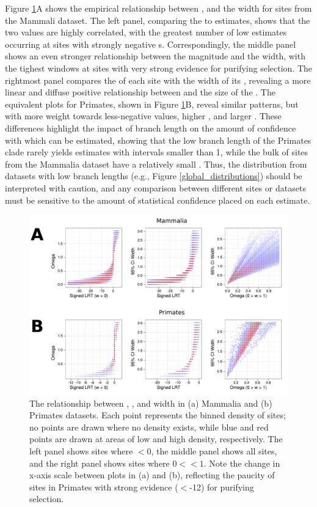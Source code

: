 Figure \ref{sites_scatters}A shows the empirical relationship between
\slrt, \omgml and the \ci width for sites from the Mammali
dataset. The left panel, comparing the \slrt to \nz \omgml estimates,
shows that the two values are highly correlated, with the greatest
number of low \omgml estimates occurring at sites with strongly
negative \slrt{}s. Correspondingly, the middle panel shows an even
stronger relationship between the \slrt magnitude and the \ci width,
with the tighest windows at sites with very strong evidence for
purifying selection. The rightmost panel compares the \omgml of each
site with the width of its \ci, revealing a more linear and diffuse
positive relationship between \omgml and the size of the \ci. The
equivalent plots for Primates, shown in Figure \ref{sites_scatters}B,
reveal similar patterns, but with more weight towards less-negative
\slrt values, higher \omgml, and larger \ci. These differences
highlight the impact of branch length on the amount of confidence with
which \omg can be estimated, showing that the low branch length of the
Primates clade rarely yields \omgml estimates with \ci intervals
smaller than 1, while the bulk of sites from the Mammalia dataset have
a relatively small \ci. Thus, the \omgml distribution from datasets
with low branch lengths (e.g., Figure \ref{global_distributions})
should be interpreted with caution, and any comparison between
different sites or datasets must be sensitive to the amount of
statistical confidence placed on each estimate.

\begin{figure}
\centering
\includegraphics[scale=0.6]{Figs/sites_scatters.pdf}
\caption{The relationship between \slrt, \omgml, and \ci width in (a)
  Mammalia and (b) Primates datasets. Each point represents the binned
  density of sites; no points are drawn where no density exists, while
  blue and red points are drawn at areas of low and high density,
  respectively. The left panel shows sites where \omgml$<0$, the
  middle panel shows all sites, and the right panel shows sites where
  $0<$\xspace\omgml$<1$. Note the change in x-axis scale between plots
  in (a) and (b), reflecting the paucity of sites in Primates with
  strong evidence (\slrt$<$-12) for purifying selection.}
\label{sites_scatters}
\end{figure}

